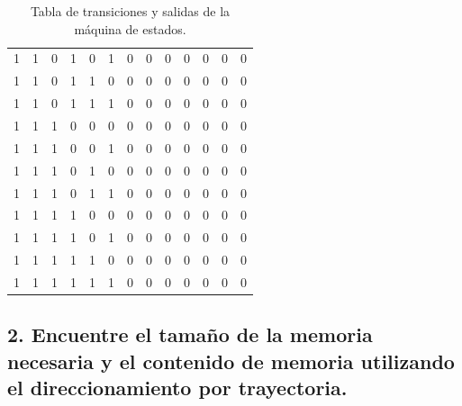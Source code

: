 \documentclass[12pt, letterpaper]{article}
\begin{document}
\begin{table}[H]
\begin{center}
\begin{tabular}{|ccc|ccc|ccc|cccc|}
    1 & 1 & 0 & 1 & 0 & 1 & 0 & 0 & 0 & \cellcolor{ForestGreen!90}0 & \cellcolor{ForestGreen!90}0 & \cellcolor{ForestGreen!90}0 & \cellcolor{ForestGreen!90}0 \\
    1 & 1 & 0 & 1 & 1 & 0 & 0 & 0 & 0 & \cellcolor{ForestGreen!90}0 & \cellcolor{ForestGreen!90}0 & \cellcolor{ForestGreen!90}0 & \cellcolor{ForestGreen!90}0 \\
    1 & 1 & 0 & 1 & 1 & 1 & 0 & 0 & 0 & \cellcolor{ForestGreen!90}0 & \cellcolor{ForestGreen!90}0 & \cellcolor{ForestGreen!90}0 & \cellcolor{ForestGreen!90}0 \\
    \hline
    1 & 1 & 1 & 0 & 0 & 0 & 0 & 0 & 0 & \cellcolor{ForestGreen!90}0 & \cellcolor{ForestGreen!90}0 & \cellcolor{ForestGreen!90}0 & \cellcolor{ForestGreen!90}0 \\
    1 & 1 & 1 & 0 & 0 & 1 & 0 & 0 & 0 & \cellcolor{ForestGreen!90}0 & \cellcolor{ForestGreen!90}0 & \cellcolor{ForestGreen!90}0 & \cellcolor{ForestGreen!90}0 \\
    1 & 1 & 1 & 0 & 1 & 0 & 0 & 0 & 0 & \cellcolor{ForestGreen!90}0 & \cellcolor{ForestGreen!90}0 & \cellcolor{ForestGreen!90}0 & \cellcolor{ForestGreen!90}0 \\
    1 & 1 & 1 & 0 & 1 & 1 & 0 & 0 & 0 & \cellcolor{ForestGreen!90}0 & \cellcolor{ForestGreen!90}0 & \cellcolor{ForestGreen!90}0 & \cellcolor{ForestGreen!90}0 \\
    1 & 1 & 1 & 1 & 0 & 0 & 0 & 0 & 0 & \cellcolor{ForestGreen!90}0 & \cellcolor{ForestGreen!90}0 & \cellcolor{ForestGreen!90}0 & \cellcolor{ForestGreen!90}0 \\
    1 & 1 & 1 & 1 & 0 & 1 & 0 & 0 & 0 & \cellcolor{ForestGreen!90}0 & \cellcolor{ForestGreen!90}0 & \cellcolor{ForestGreen!90}0 & \cellcolor{ForestGreen!90}0 \\
    1 & 1 & 1 & 1 & 1 & 0 & 0 & 0 & 0 & \cellcolor{ForestGreen!90}0 & \cellcolor{ForestGreen!90}0 & \cellcolor{ForestGreen!90}0 & \cellcolor{ForestGreen!90}0 \\
    1 & 1 & 1 & 1 & 1 & 1 & 0 & 0 & 0 & \cellcolor{ForestGreen!90}0 & \cellcolor{ForestGreen!90}0 & \cellcolor{ForestGreen!90}0 & \cellcolor{ForestGreen!90}0 \\
    \hline
    \end{tabular}
\end{center}
\caption{Tabla de transiciones y salidas de la máquina de estados.}
\label{tab:tabla_transiciones_estados_salidas_2}
\end{table}

\subsection*{2. Encuentre el tamaño de la memoria necesaria y el contenido de memoria utilizando  el direccionamiento por trayectoria.}
\end{document}
